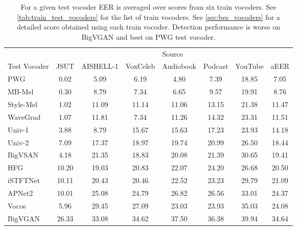 \begin{table*}[htb!]
    \caption{For a given test vocoder EER is averaged over scores from six train vocoders. See \autoref{tab:train_test_vocoders} for the list of train vocoders. See \autoref{sec:bes_vocoders} for a detailed score obtained using each train vocoder. Detection performance is worse on BigVGAN and best on PWG test vocoder. }
    \label{tab:harder_detect}
    \vskip 0.15in
\begin{center}
\begin{small}
\begin{sc}
    \begin{tabular}{lccccccc}
    \toprule
    & \multicolumn{7}{c}{Source}\\
    \cmidrule(lr){2-8}
Test Vocoder   & JSUT & AISHELL-1  &VoxCeleb & Audiobook & Podcast & YouTube & aEER\\ 
    \midrule
    \rowcolor{green!45}
   PWG & 0.02 & 5.09 & 6.19 & 4.80 & 7.39 & 18.85 &7.05
   \\
   \hline
    MB-Mel & 0.30 & 8.79 & 7.34 & 6.65 & 9.57 & 19.91 & 8.76\\ 
   \hline
    Style-Mel & 1.02 & 11.09 & 11.14 & 11.06 & 13.15 & 21.38& 11.47 \\ 
   \hline
   WaveGrad  & 1.07 & 11.81 & 7.34 & 11.26 & 14.32 & 23.31 & 11.51\\ 
   \hline
    Univ-1 & 3.88 & 8.79 & 15.67 & 15.63 & 17.23 & 23.93 &14.18\\ 
   \hline
   Univ-2 & 7.09 & 17.37 & 18.97 & 19.74 & 20.99 & 26.50 & 18.44\\ 
   \hline 
    BigVSAN & 4.18 & 21.35 & 18.83 & 20.08 & 21.39 & 30.65 &19.41\\ 
   \hline
   HFG & 10.20 & 19.03 & 20.83 & 22.07 & 24.20 & 26.68& 20.50 \\ 
   \hline
    iSTFTNet & 10.11 & 20.43 & 20.46 & 22.52 & 23.23 & 29.79 & 21.09\\ 
    \hline
    APNet2 & 10.01 & 25.08 & 24.79 & 26.82 & 26.56 & 33.01 &24.37 \\ 
   \hline
   Vocos &  5.96 & 29.45 & 27.09 & 23.03 & 23.93 & 35.03 &24.08\\ 
   \hline
   \rowcolor{red!45}
   BigVGAN & 26.33 & 33.08 & 34.62 & 37.50 & 36.38 & 39.94 &34.64\\ 
   \bottomrule
    \end{tabular}
    \end{sc}
\end{small}
\end{center}
\vskip -0.1in
\end{table*}

